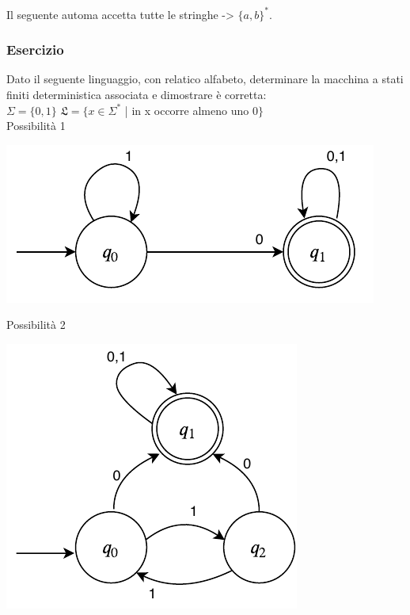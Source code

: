 \documentclass[a4paper, 10pt]{report}
\begin{document}
\noindent Il seguente automa accetta tutte le stringhe -> $\{a, b\}^*$.

\subsubsection*{Esercizio}

Dato il seguente linguaggio, con relatico alfabeto, determinare la macchina a stati finiti deterministica associata e dimostrare è corretta:\\

$\Sigma = \{0, 1\}$ \hspace{1cm} $\mathfrak{L} = \{ x \in \Sigma^*$ | in x occorre almeno uno 0$\}$\\
 
\noindent Possibilità 1

\begin{center}
\includegraphics[scale=1]{14ottobre05.pdf}
\end{center}

\noindent Possibilità 2

\begin{center}
\includegraphics[scale=1]{14ottobre06.pdf}
\end{center}
\end{document}
